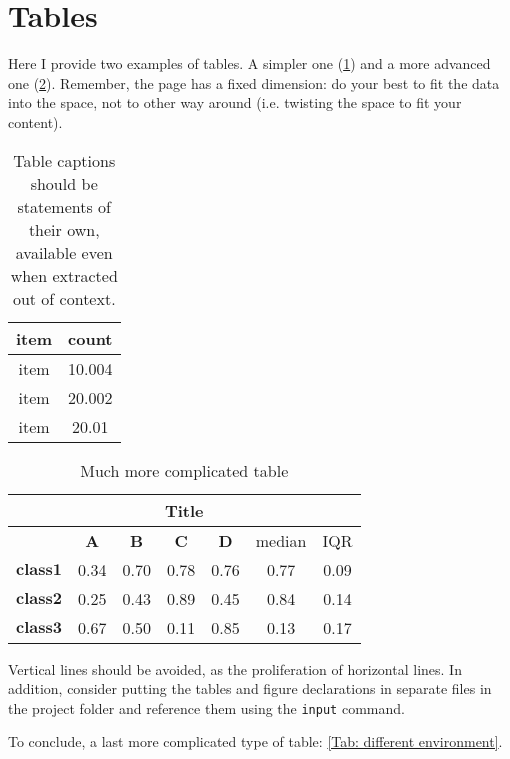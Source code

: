 \section{Tables}
\label{sec: Tables}

Here I provide two examples of tables. A simpler one (\cref{Tab: example}) and a more advanced one (\cref{Tab: complicate example}). Remember, the page has a fixed dimension: do your best to fit the data into the space, not to other way around (i.e. twisting the space to fit your content).

\begin{table}[h]
\caption{Table captions should be statements of their own, available even when extracted out of context.}
\label{Tab: example}
\centering
\begin{tabular}[t]{cc}
\toprule
\textbf{item} & \textbf{count} \\
\midrule
item & 10.004 \\
item & 20.002 \\
item & 20.01 \\
\bottomrule
\end{tabular}
\end{table}


\begin{table}[htb!p]
\caption{Much more complicated table}
\label{Tab: complicate example}
\centering
\begin{adjustbox}{max width=.8\textwidth}
\begin{tabular}{ccccccc}
\toprule
\multicolumn{7}{c}{Title} \\
\midrule
& {\textbf{A}} & {\textbf{B}} & {\textbf{C}} & {\textbf{D}} & median & IQR \\
\cmidrule(lr){2-5}
\cmidrule(lr){6-7}
${\mathbf{class 1}}$ & 0.34 & 0.70 & 0.78 & 0.76 & 0.77 & 0.09\\
${\mathbf{class 2}}$ & 0.25 & 0.43 & 0.89 & 0.45 & 0.84 & 0.14\\
${\mathbf{class 3}}$ & 0.67 & 0.50 & 0.11 & 0.85 & 0.13 & 0.17\\
\bottomrule
\end{tabular}
\end{adjustbox}
\end{table}

Vertical lines should be avoided, as the proliferation of horizontal lines. In addition, consider putting the tables and figure declarations in separate files in the project folder and reference them using the \lstinline{input} command.

To conclude, a last more complicated type of table: \cref{Tab: different environment}.

